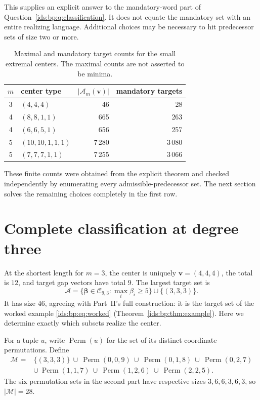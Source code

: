 \documentclass[11pt,letterpaper]{article}
\theoremstyle{definition}\newtheorem{definition}[theorem]{Definition}
\theoremstyle{remark}\newtheorem{remark}[theorem]{Remark}
\theoremstyle{definition}\newtheorem{question}[theorem]{Question}
\newcommand{\bpC}[2]{\mathcal C_{#1,#2}}
\newcommand{\Adm}[1]{\mathcal A_m(#1)}
\begin{document}
This supplies an explicit answer to the mandatory-word part of
Question~\ref{ids:bp:q:classification}. It does not equate the mandatory set with an entire realizing
language. Additional choices may be necessary to hit predecessor sets of
size two or more.

\begin{table}[htbp]
\centering\small
\caption{Maximal and mandatory target counts for the small extremal centers.
The maximal counts are not asserted to be minima.}
\label{ids:si:tab:mandatory}
\begin{tabular}{clrr}
\toprule
$m$ & center type & $|\Adm{\mathbf v}|$ & mandatory targets\\
\midrule
3&$(4,4,4)$&46&28\\
4&$(8,8,1,1)$&665&263\\
4&$(6,6,5,1)$&656&257\\
5&$(10,10,1,1,1)$&7\,280&3\,080\\
5&$(7,7,7,1,1)$&7\,255&3\,066\\
\bottomrule
\end{tabular}
\end{table}
These finite counts were obtained from the explicit theorem and checked
independently by enumerating every admissible-predecessor set. The next
section solves the remaining choices completely in the first row.

\section{Complete classification at degree three}\label{ids:si:sec:degree3}

At the shortest length for $m=3$, the center is uniquely
$\mathbf v=(4,4,4)$, the total is $12$, and target gap vectors have total $9$.
The largest target set is
\begin{equation}\label{ids:si:eq:A3}
 \mathcal A=\{\boldsymbol\beta\in\bpC{9}{3}:\max_i\beta_i\geq5\}
                  \cup\{(3,3,3)\}.
\end{equation}
It has size $46$, agreeing with Part~II's full construction: it is the
target set of the worked example \eqref{ids:bp:eq:worked}
(Theorem~\ref{ids:bp:thm:example}). Here we
determine exactly which subsets realize the center.

For a tuple $u$, write $\operatorname{Perm}(u)$ for the set of its distinct
coordinate permutations. Define
\begin{equation}\label{ids:si:eq:mandatory3}
 \begin{split}
 \mathcal M={}&\{(3,3,3)\}\ \cup\ \operatorname{Perm}(0,0,9)
 \ \cup\ \operatorname{Perm}(0,1,8)\ \cup\ \operatorname{Perm}(0,2,7)\\
 &\cup\ \operatorname{Perm}(1,1,7)\ \cup\ \operatorname{Perm}(1,2,6)
 \ \cup\ \operatorname{Perm}(2,2,5).
 \end{split}
\end{equation}
The six permutation sets in the second part have respective sizes
$3,6,6,3,6,3$, so $|\mathcal M|=28$.
\end{document}
